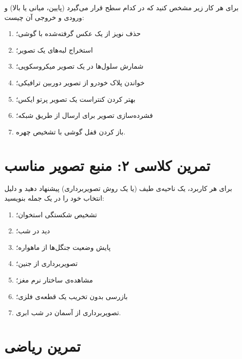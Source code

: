 \documentclass[11pt,a4paper]{article}
\begin{document}
	برای هر کار زیر مشخص کنید که در کدام سطح قرار می‌گیرد
	(پایین، میانی یا بالا) و ورودی و خروجی آن چیست:
	
	\begin{enumerate}
		\item حذف نویز از یک عکس گرفته‌شده با گوشی؛
		\item استخراج لبه‌های یک تصویر؛
		\item شمارش سلول‌ها در یک تصویر میکروسکوپی؛
		\item خواندن پلاک خودرو از تصویر دوربین ترافیکی؛
		\item بهتر کردن کنتراست یک تصویر پرتو ایکس؛
		\item فشرده‌سازی تصویر برای ارسال از طریق شبکه؛
		\item باز کردن قفل گوشی با تشخیص چهره.
	\end{enumerate}
	
	
	\section{تمرین کلاسی ۲: منبع تصویر مناسب}
	
	برای هر کاربرد، یک ناحیه‌ی طیف (یا یک روش تصویربرداری) پیشنهاد دهید
	و دلیل انتخاب خود را در یک جمله بنویسید:
	
	\begin{enumerate}
		\item تشخیص شکستگی استخوان؛
		\item دید در شب؛
		\item پایش وضعیت جنگل‌ها از ماهواره؛
		\item تصویربرداری از جنین؛
		\item مشاهده‌ی ساختار نرم مغز؛
		\item بازرسی بدون تخریب یک قطعه‌ی فلزی؛
		\item تصویربرداری از آسمان در شب ابری.
	\end{enumerate}
	
	
	\section{تمرین ریاضی}
	
\end{document}

